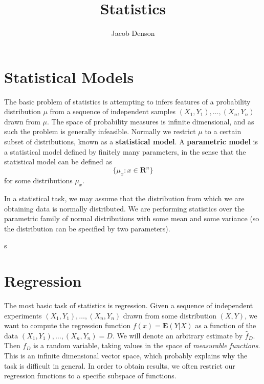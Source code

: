 

\DeclareMathOperator*{\argmin}{arg\,min}

\title{Statistics}
\author{Jacob Denson}



\maketitle
\tableofcontents
{}

\chapter{Statistical Models}

The basic problem of statistics is attempting to infers features of a probability distribution $\mu$ from a sequence of independent samples $(X_1, Y_1), \dots, (X_n, Y_n)$ drawn from $\mu$. The space of probability measures is infinite dimensional, and as such the problem is generally infeasible. Normally we restrict $\mu$ to a certain subset of distributions, known as a {\bf statistical model}. A {\bf parametric model} is a statistical model defined by finitely many parameters, in the sense that the statistical model can be defined as
%
\[ \{ \mu_x : x \in \mathbf{R}^n \} \]
%
for some distributions $\mu_x$.

\begin{example}
    In a statistical task, we may assume that the distribution from which we are obtaining data is normally distributed. We are performing statistics over the parametric family of normal distributions with some mean and some variance (so the distribution can be specified by two parameters).
\end{example}

s

\chapter{Regression}

The most basic task of statistics is regression. Given a sequence of independent experiments $(X_1, Y_1), \dots, (X_n, Y_n)$ drawn from some distribution $(X,Y)$, we want to compute the regression function $f(x) = \mathbf{E}(Y | X)$ as a function of the data $(X_1, Y_1), \dots, (X_n, Y_n) = D$. We will denote an arbitrary estimate by $\hat{f}_D$. Then $\hat{f}_D$ is a random variable, taking values in the space of {\it measurable functions}. This is an infinite dimensional vector space, which probably explains why the task is difficult in general. In order to obtain results, we often restrict our regression functions to a specific subspace of functions.


